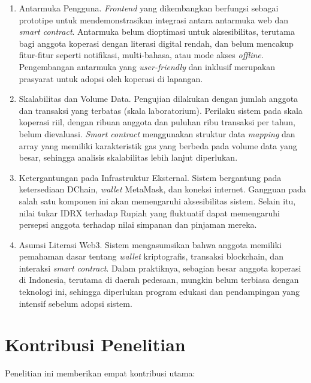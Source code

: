 \begin{enumerate}
	\item Antarmuka Pengguna. \textit{Frontend} yang dikembangkan berfungsi sebagai prototipe untuk mendemonstrasikan integrasi antara antarmuka web dan \textit{smart contract}. Antarmuka belum dioptimasi untuk aksesibilitas, terutama bagi anggota koperasi dengan literasi digital rendah, dan belum mencakup fitur-fitur seperti notifikasi, multi-bahasa, atau mode akses \textit{offline}. Pengembangan antarmuka yang \textit{user-friendly} dan inklusif merupakan prasyarat untuk adopsi oleh koperasi di lapangan.

	\item Skalabilitas dan Volume Data. Pengujian dilakukan dengan jumlah anggota dan transaksi yang terbatas (skala laboratorium). Perilaku sistem pada skala koperasi riil, dengan ribuan anggota dan puluhan ribu transaksi per tahun, belum dievaluasi. \textit{Smart contract} menggunakan struktur data \textit{mapping} dan array yang memiliki karakteristik gas yang berbeda pada volume data yang besar, sehingga analisis skalabilitas lebih lanjut diperlukan.

	\item Ketergantungan pada Infrastruktur Eksternal. Sistem bergantung pada ketersediaan DChain, \textit{wallet} MetaMask, dan koneksi internet. Gangguan pada salah satu komponen ini akan memengaruhi aksesibilitas sistem. Selain itu, nilai tukar IDRX terhadap Rupiah yang fluktuatif dapat memengaruhi persepsi anggota terhadap nilai simpanan dan pinjaman mereka.

	\item Asumsi Literasi Web3. Sistem mengasumsikan bahwa anggota memiliki pemahaman dasar tentang \textit{wallet} kriptografis, transaksi blockchain, dan interaksi \textit{smart contract}. Dalam praktiknya, sebagian besar anggota koperasi di Indonesia, terutama di daerah pedesaan, mungkin belum terbiasa dengan teknologi ini, sehingga diperlukan program edukasi dan pendampingan yang intensif sebelum adopsi sistem.
\end{enumerate}

\section{Kontribusi Penelitian}

Penelitian ini memberikan empat kontribusi utama:

